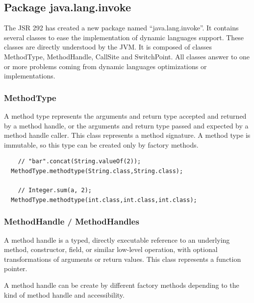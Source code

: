 \documentclass{sigplanconf}
\def \DALVIK{\mbox{Dalvik}\xspace}
\def \Jsr{JSR\xspace}
\def \JSR{\Jsr 292\xspace}
\def \JVM{JVM\xspace}
\begin{document}
    \subsection{Package java.lang.invoke}
      The \JSR has created a new package named ``java.lang.invoke''.
      It contains several classes to ease the implementation of dynamic languages support.
      These classes are directly understood by the \JVM.
      It is composed of classes MethodType, MethodHandle, CallSite and SwitchPoint.
      All classes answer to one or more problems coming from dynamic languages optimizations or implementations.

      \subsubsection{MethodType}
        A method type represents the arguments and return type accepted and returned by a method handle,
        or the arguments and return type passed and expected by a method handle caller.
        This class represents a method signature.
        A method type is immutable, so this type can be created only by factory methods.
        

        {\tiny
          \begin{verbatim}
    // "bar".concat(String.valueOf(2));
  MethodType.methodtype(String.class,String.class);

    // Integer.sum(a, 2);
  MethodType.methodtype(int.class,int.class,int.class);
          \end{verbatim}
        }

      \subsubsection{MethodHandle / MethodHandles}
        A method handle is a typed, directly executable reference to
        an underlying method, constructor, field, or similar low-level operation,
        with optional transformations of arguments or return values.
        This class represents a function pointer.
        
        A method handle can be create by different factory methods depending to the kind of method handle and accessibility.
        
\end{document}
